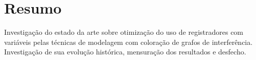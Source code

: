 \section{Resumo}

Investigação do estado da arte sobre otimização do uso de registradores com variáveis pelas técnicas de modelagem com coloração de grafos de interferência. Investigação de sua evolução histórica, mensuração dos resultados e desfecho.